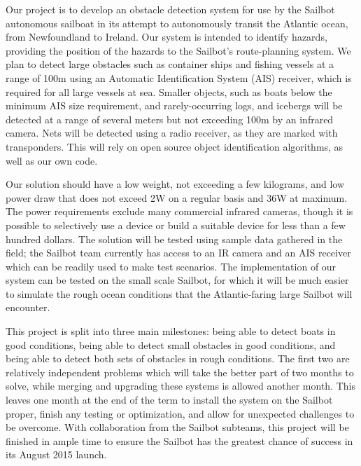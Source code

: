 Our project is to develop an obstacle detection system for use by the Sailbot autonomous sailboat in its attempt to autonomously transit the Atlantic ocean, from Newfoundland to Ireland. Our system is intended to identify hazards, providing the position of the hazards to the Sailbot's route-planning system. We plan to detect large obstacles such as container ships and fishing vessels at a range of 100m using an Automatic Identification System (AIS) receiver, which is required for all large vessels at sea. Smaller objects, such as boats below the minimum AIS size requirement, and rarely-occurring logs, and icebergs will be detected at a range of several meters but not exceeding 100m by an infrared camera. Nets will be detected using a radio receiver, as they are marked with transponders. This will rely on open source object identification algorithms, as well as our own code.

Our solution should have a low weight, not exceeding a few kilograms, and low power draw that does not exceed 2W on a regular basis and 36W at maximum. The power requirements exclude many commercial infrared cameras, though it is possible to selectively use a device or build a suitable device for less than a few hundred dollars. The solution will be tested using sample data gathered in the field; the Sailbot team currently has access to an IR camera and an AIS receiver which can be readily used to make test scenarios. The implementation of our system can be tested on the small scale Sailbot, for which it will be much easier to simulate the rough ocean conditions that the Atlantic-faring large Sailbot will encounter.

This project is split into three main milestones: being able to detect boats in good conditions, being able to detect small obstacles in good conditions, and being able to detect both sets of obstacles in rough conditions. The first two are relatively independent problems which will take the better part of two months to solve, while merging and upgrading these systems is allowed another month. This leaves one month at the end of the term to install the system on the Sailbot proper, finish any testing or optimization, and allow for unexpected challenges to be overcome. With collaboration from the Sailbot subteams, this project will be finished in ample time to ensure the Sailbot has the greatest chance of success in its August 2015 launch.
